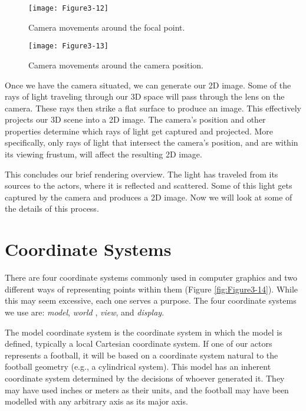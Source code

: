 \begin{figure}[!htb]
  \centering
  \texttt{[image: Figure3-12]}\\
  \caption{Camera movements around the focal point.}\label{fig:Figure3-12}
\end{figure}

\begin{figure}[!htb]
  \centering
  \texttt{[image: Figure3-13]}\\
  \caption{Camera movements around the camera position.}\label{fig:Figure3-13}
\end{figure}

Once we have the camera situated, we can generate our 2D image. Some of the rays of light traveling through our 3D space will pass through the lens on the camera. These rays then strike a flat surface to produce an image. This effectively projects our 3D scene into a 2D image. The camera's position and other properties determine which rays of light get captured and projected. More specifically, only rays of light that intersect the camera's position, and are within its viewing frustum, will affect the resulting 2D image.

This concludes our brief rendering overview. The light has traveled from its sources to the actors, where it is reflected and scattered. Some of this light gets captured by the camera and produces a 2D image. Now we will look at some of the details of this process.

\section{Coordinate Systems}
\label{sec:coordinate_systems}

There are four coordinate systems commonly used in computer graphics and two different ways of representing points within them (Figure \ref{fig:Figure3-14}). While this may seem excessive, each one serves a purpose. The four coordinate systems we use are: \emph{model}, \emph{world} , \emph{view}, and \emph{display}.

The model coordinate system is the coordinate system in which the model is defined, typically a local Cartesian coordinate system. If one of our actors represents a football, it will be based on a coordinate system natural to the football geometry (e.g., a cylindrical system). This model has an inherent coordinate system determined by the decisions of whoever generated it. They may have used inches or meters as their units, and the football may have been modelled with any arbitrary axis as its major axis.


